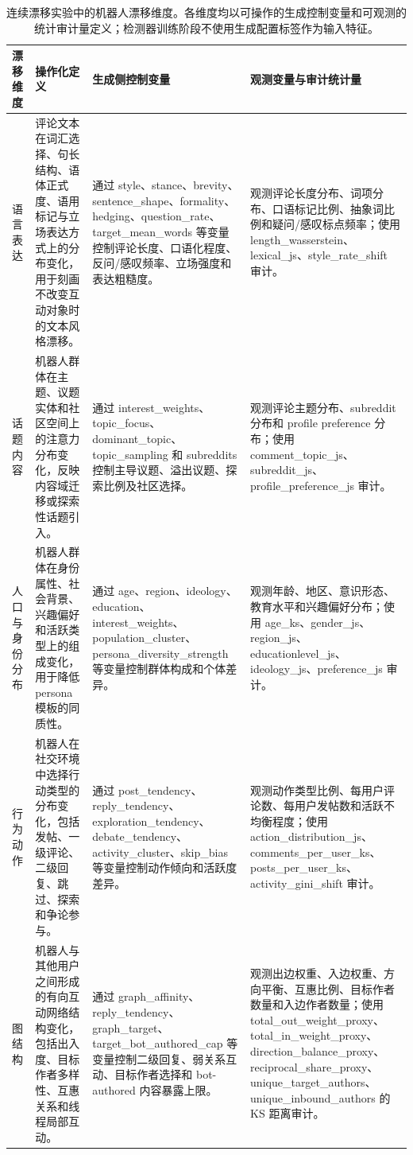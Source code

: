 \begin{table}[t]
\centering
\small
\caption{连续漂移实验中的机器人漂移维度。各维度均以可操作的生成控制变量和可观测的统计审计量定义；检测器训练阶段不使用生成配置标签作为输入特征。}
\label{tab:continuous-drift-dimensions}
\begin{tabular}{p{2.2cm}p{4.2cm}p{4.7cm}p{4.9cm}}
\hline
\textbf{漂移维度} & \textbf{操作化定义} & \textbf{生成侧控制变量} & \textbf{观测变量与审计统计量} \\
\hline
语言表达 & 评论文本在词汇选择、句长结构、语体正式度、语用标记与立场表达方式上的分布变化，用于刻画不改变互动对象时的文本风格漂移。 & 通过 style、stance、brevity、sentence\_shape、formality、hedging、question\_rate、target\_mean\_words 等变量控制评论长度、口语化程度、反问/感叹频率、立场强度和表达粗糙度。 & 观测评论长度分布、词项分布、口语标记比例、抽象词比例和疑问/感叹标点频率；使用 length\_wasserstein、lexical\_js、style\_rate\_shift 审计。 \\
\hline
话题内容 & 机器人群体在主题、议题实体和社区空间上的注意力分布变化，反映内容域迁移或探索性话题引入。 & 通过 interest\_weights、topic\_focus、dominant\_topic、topic\_sampling 和 subreddits 控制主导议题、溢出议题、探索比例及社区选择。 & 观测评论主题分布、subreddit 分布和 profile preference 分布；使用 comment\_topic\_js、subreddit\_js、profile\_preference\_js 审计。 \\
\hline
人口与身份分布 & 机器人群体在身份属性、社会背景、兴趣偏好和活跃类型上的组成变化，用于降低 persona 模板的同质性。 & 通过 age、region、ideology、education、interest\_weights、population\_cluster、persona\_diversity\_strength 等变量控制群体构成和个体差异。 & 观测年龄、地区、意识形态、教育水平和兴趣偏好分布；使用 age\_ks、gender\_js、region\_js、educationlevel\_js、ideology\_js、preference\_js 审计。 \\
\hline
行为动作 & 机器人在社交环境中选择行动类型的分布变化，包括发帖、一级评论、二级回复、跳过、探索和争论参与。 & 通过 post\_tendency、reply\_tendency、exploration\_tendency、debate\_tendency、activity\_cluster、skip\_bias 等变量控制动作倾向和活跃度差异。 & 观测动作类型比例、每用户评论数、每用户发帖数和活跃不均衡程度；使用 action\_distribution\_js、comments\_per\_user\_ks、posts\_per\_user\_ks、activity\_gini\_shift 审计。 \\
\hline
图结构 & 机器人与其他用户之间形成的有向互动网络结构变化，包括出入度、目标作者多样性、互惠关系和线程局部互动。 & 通过 graph\_affinity、reply\_tendency、graph\_target、target\_bot\_authored\_cap 等变量控制二级回复、弱关系互动、目标作者选择和 bot-authored 内容暴露上限。 & 观测出边权重、入边权重、方向平衡、互惠比例、目标作者数量和入边作者数量；使用 total\_out\_weight\_proxy、total\_in\_weight\_proxy、direction\_balance\_proxy、reciprocal\_share\_proxy、unique\_target\_authors、unique\_inbound\_authors 的 KS 距离审计。 \\

\end{tabular}
\end{table}
